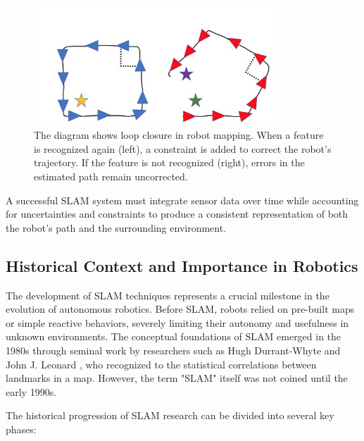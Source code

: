 \documentclass[12pt]{article}
\begin{document}
    \begin{figure}[h!]
        \centering
        \includegraphics[width=0.8\textwidth]{loop_closure.png}
        \caption{The diagram shows loop closure in robot mapping. When a feature is recognized again (left), a constraint is added to correct the robot's trajectory. 
        If the feature is not recognized (right), errors in the estimated path remain uncorrected. \cite{loop_closure_img}}
        \label{fig:loop_closure}
    \end{figure}

    A successful SLAM system must integrate sensor data over time while accounting for uncertainties and constraints to produce a consistent representation of both the robot's path 
    and the surrounding environment.

    \newpage

    \subsection{Historical Context and Importance in Robotics}
    The development of SLAM techniques represents a crucial milestone in the evolution of autonomous robotics. Before SLAM, robots relied on pre-built maps or simple reactive behaviors, 
    severely limiting their autonomy and usefulness in unknown environments.
    The conceptual foundations of SLAM emerged in the 1980s through seminal work by researchers such as Hugh Durrant-Whyte and John J. Leonard \cite{seminal_paper}, who recognized 
    to the statistical correlations between landmarks in a map. However, the term "SLAM" itself was not coined until the early 1990s.

    The historical progression of SLAM research can be divided into several key phases:
\end{document}
